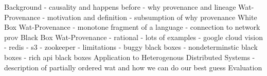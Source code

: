 Background
  - causality and happens before
  - why provenance and lineage
Wat-Provenance
  - motivation and definition
  - subsumption of why provenance
White Box Wat-Provenance
  - monotone fragment of a language
  - connection to network prov
Black Box Wat-Provenance
  - rational
  - lots of examples
    - google cloud vision
    - redis
    - s3
    - zookeeper
  - limitations
    - buggy black boxes
    - nondeterminstic black boxes
    - rich api black boxes
Application to Heterogenous Distributed Systems
  - description of partially ordered wat and how we can do our best guess
Evaluation

